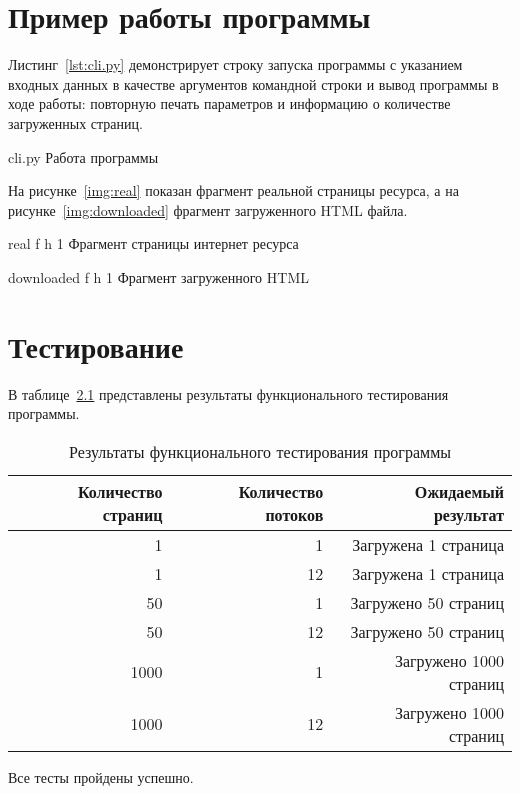 \chapter{Пример работы программы}

Листинг~\ref{lst:cli.py} демонстрирует строку запуска программы с указанием входных данных в качестве аргументов командной строки и вывод программы в ходе работы: повторную печать параметров и информацию о количестве загруженных страниц.

{cli.py} %
{Работа программы} %

На рисунке~\ref{img:real} показан фрагмент реальной страницы ресурса, а на рисунке~\ref{img:downloaded} фрагмент загруженного HTML файла.

{real}
{f}
{h}
{1 \textwidth}
{Фрагмент страницы интернет ресурса}

\clearpage

{downloaded}
{f}
{h}
{1 \textwidth}
{Фрагмент загруженного HTML}

\clearpage

\chapter{Тестирование}

В таблице~\ref{tbl:test} представлены результаты функционального тестирования программы.

\begin{table}[ht]
    \small
    \begin{center}
        \begin{threeparttable}
            \caption{Результаты функционального тестирования программы}
            \label{tbl:test}
            \begin{tabular}{|r|r|r|}
                \hline
                \textbf{Количество страниц} & \textbf{Количество потоков} & \textbf{Ожидаемый результат}  \\
                \hline
                1 & 1  & Загружена 1 страница \\
                \hline
                1  & 12  & Загружена 1 страница \\
                \hline
                50  & 1  & Загружено 50 страниц \\
                \hline
                50  & 12  & Загружено 50 страниц \\
                \hline
                1000  & 1  & Загружено 1000 страниц \\
                \hline
                1000  & 12  & Загружено 1000 страниц \\
                \hline
            \end{tabular}
        \end{threeparttable}
    \end{center}
\end{table}

Все тесты пройдены успешно.